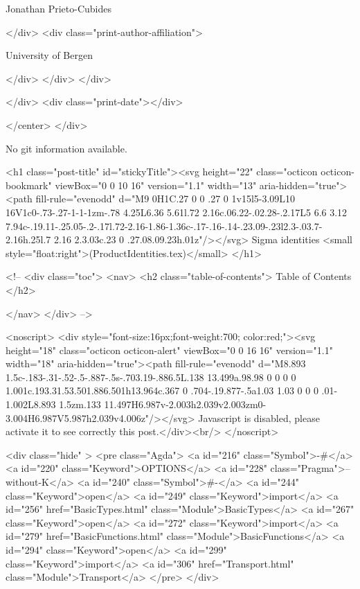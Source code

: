                   Jonathan Prieto-Cubides
                
              </div>
              <div class="print-author-affiliation">
                
                  University of Bergen
                
                </div>
            </div>
          </div>
          
          
        </div>
        <div class="print-date"></div>
        
        
    </center>
  </div>

  
  No git information available.
  

  <h1 class="post-title" id="stickyTitle"><svg height="22" class="octicon octicon-bookmark" viewBox="0 0 10 16" version="1.1" width="13" aria-hidden="true"><path fill-rule="evenodd" d="M9 0H1C.27 0 0 .27 0 1v15l5-3.09L10 16V1c0-.73-.27-1-1-1zm-.78 4.25L6.36 5.61l.72 2.16c.06.22-.02.28-.2.17L5 6.6 3.12 7.94c-.19.11-.25.05-.2-.17l.72-2.16-1.86-1.36c-.17-.16-.14-.23.09-.23l2.3-.03.7-2.16h.25l.7 2.16 2.3.03c.23 0 .27.08.09.23h.01z"/></svg> Sigma identities <small style="float:right">(ProductIdentities.tex)</small>
  </h1>

  <!-- 
  <div class="toc">
    <nav>
    <h2 class="table-of-contents"> Table of Contents </h2>
      

    </nav>
  </div>
   -->

  <noscript>
  <div style="font-size:16px;font-weight:700; color:red;"><svg height="18" class="octicon octicon-alert" viewBox="0 0 16 16" version="1.1" width="18" aria-hidden="true"><path fill-rule="evenodd" d="M8.893 1.5c-.183-.31-.52-.5-.887-.5s-.703.19-.886.5L.138 13.499a.98.98 0 0 0 0 1.001c.193.31.53.501.886.501h13.964c.367 0 .704-.19.877-.5a1.03 1.03 0 0 0 .01-1.002L8.893 1.5zm.133 11.497H6.987v-2.003h2.039v2.003zm0-3.004H6.987V5.987h2.039v4.006z"/></svg> Javascript is disabled, please activate it to see correctly this post.</div><br/>
  </noscript>

  <div class="hide" >
<pre class="Agda">
<a id="216" class="Symbol">{-#</a> <a id="220" class="Keyword">OPTIONS</a> <a id="228" class="Pragma">--without-K</a> <a id="240" class="Symbol">#-}</a>
<a id="244" class="Keyword">open</a> <a id="249" class="Keyword">import</a> <a id="256" href="BasicTypes.html" class="Module">BasicTypes</a>
<a id="267" class="Keyword">open</a> <a id="272" class="Keyword">import</a> <a id="279" href="BasicFunctions.html" class="Module">BasicFunctions</a>
<a id="294" class="Keyword">open</a> <a id="299" class="Keyword">import</a> <a id="306" href="Transport.html" class="Module">Transport</a>
</pre>
</div>

